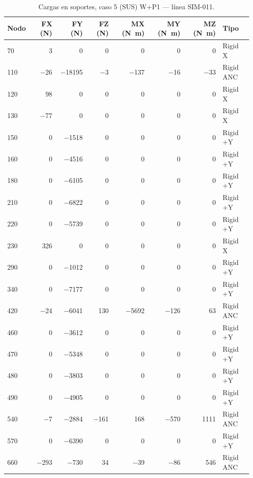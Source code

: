 \begin{table}[htbp]
  \centering
  \footnotesize
  \caption{Cargas en soportes, caso 5 (SUS) W+P1 — línea SIM-011.}
  \label{tab:restricciones-sus}
  \begin{tabular}{lrrrrrrl}
    \toprule
    Nodo & FX (\si{N}) & FY (\si{N}) & FZ (\si{N}) & MX (\si{N.m}) & MY (\si{N.m}) & MZ (\si{N.m}) & Tipo \\
    \midrule
    70 & \num{3} & \num{0} & \num{0} & \num{0} & \num{0} & \num{0} & Rigid X \\
    110 & \num{-26} & \num{-18195} & \num{-3} & \num{-137} & \num{-16} & \num{-33} & Rigid ANC \\
    120 & \num{98} & \num{0} & \num{0} & \num{0} & \num{0} & \num{0} & Rigid X \\
    130 & \num{-77} & \num{0} & \num{0} & \num{0} & \num{0} & \num{0} & Rigid X \\
    150 & \num{0} & \num{-1518} & \num{0} & \num{0} & \num{0} & \num{0} & Rigid +Y \\
    160 & \num{0} & \num{-4516} & \num{0} & \num{0} & \num{0} & \num{0} & Rigid +Y \\
    180 & \num{0} & \num{-6105} & \num{0} & \num{0} & \num{0} & \num{0} & Rigid +Y \\
    210 & \num{0} & \num{-6822} & \num{0} & \num{0} & \num{0} & \num{0} & Rigid +Y \\
    220 & \num{0} & \num{-5739} & \num{0} & \num{0} & \num{0} & \num{0} & Rigid +Y \\
    230 & \num{326} & \num{0} & \num{0} & \num{0} & \num{0} & \num{0} & Rigid X \\
    290 & \num{0} & \num{-1012} & \num{0} & \num{0} & \num{0} & \num{0} & Rigid +Y \\
    340 & \num{0} & \num{-7177} & \num{0} & \num{0} & \num{0} & \num{0} & Rigid +Y \\
    420 & \num{-24} & \num{-6041} & \num{130} & \num{-5692} & \num{-126} & \num{63} & Rigid ANC \\
    460 & \num{0} & \num{-3612} & \num{0} & \num{0} & \num{0} & \num{0} & Rigid +Y \\
    470 & \num{0} & \num{-5348} & \num{0} & \num{0} & \num{0} & \num{0} & Rigid +Y \\
    480 & \num{0} & \num{-3803} & \num{0} & \num{0} & \num{0} & \num{0} & Rigid +Y \\
    490 & \num{0} & \num{-4905} & \num{0} & \num{0} & \num{0} & \num{0} & Rigid +Y \\
    540 & \num{-7} & \num{-2884} & \num{-161} & \num{168} & \num{-570} & \num{1111} & Rigid ANC \\
    570 & \num{0} & \num{-6390} & \num{0} & \num{0} & \num{0} & \num{0} & Rigid +Y \\
    660 & \num{-293} & \num{-730} & \num{34} & \num{-39} & \num{-86} & \num{546} & Rigid ANC \\
    \bottomrule
  \end{tabular}
\end{table}
